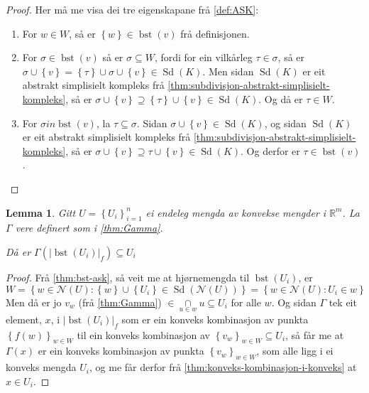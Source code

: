 \documentclass[a4paper, 12pt, norsk]{article}
\theoremstyle{plain}
\newtheorem{lemma}[theorem]{Lemma}
\theoremstyle{definition}
\newcommand{\Rb}{\mathbb{R}}
\newcommand{\Nc}{\mathcal{N}}
\newcommand{\intersect}{ \mathop{\cap}\limits } %
\newcommand{\union}{ \mathop{\cup}\limits }
\newcommand{\gr}[1]{ \lvert #1 \rvert } %
\newcommand{\set}[1]{ \left \{ #1 \right \} } %
\DeclareMathOperator{\Sd}{Sd}
\DeclareMathOperator{\bst}{bst}
\begin{document}
\begin{proof}
	Her må me visa dei tre eigenskapane frå \autoref{def:ASK}:
	\begin{enumerate}
		\item{For \( w \in W \), så er \( \set{w} \in \bst(v) \) frå definisjonen.}
  		\item{For \( \sigma \in \bst(v) \) så er \( \sigma \subseteq W \), fordi for ein vilkårleg \( \tau \in \sigma \), så er \( \sigma \union \set{v} = \set{\tau} \union \sigma \union \set{v} \in \Sd(K) \). Men sidan \( \Sd(K) \) er eit abstrakt simplisielt kompleks frå \autoref{thm:subdivisjon-abstrakt-simplisielt-kompleks}, så er \( \sigma \union \set{v} \supseteq \set{\tau} \union \set{v} \in \Sd(K) \). Og då er \( \tau \in W \).}
    	\item{For \( \sigma in \bst(v) \), la \( \tau \subseteq \sigma \). Sidan \( \sigma \union \set{v} \in \Sd(K) \), og sidan \( \Sd(K) \) er eit abstrakt simplisielt kompleks frå \autoref{thm:subdivisjon-abstrakt-simplisielt-kompleks}, så er \( \sigma \union \set{v} \supseteq \tau \union \set{v} \in \Sd(K) \). Og derfor er \( \tau \in \bst(v) \).}
	\end{enumerate}
\end{proof}

\begin{lemma} \label{thm:Gamma-inni-ui}
	Gitt \( U = \set{U_i}_{i=1}^n \) ei endeleg mengda av konvekse mengder i \( \Rb^m \). La \( \Gamma \) vere definert som i \autoref{thm:Gamma}.

	Då er \( \Gamma(\gr{\bst(U_i)}_f) \subseteq U_i \)
\end{lemma}

\begin{proof}
	Frå \autoref{thm:bst-ask}, så veit me at hjørnemengda til \( \bst(U_i) \), er
	\[
		W = \set{w \in \Nc(U) : \set{w} \union \set{U_i} \in \Sd(\Nc(U))}=\set{w \in \Nc(U) : U_i \in w}
	\] 
	Men då er jo \( v_w \) (frå \autoref{thm:Gamma}) \( \in \intersect_{u \in w} u \subseteq U_i \) for alle \( w \). Og sidan \( \Gamma \) tek eit element, \( x \), i \( \gr{\bst(U_i)}_f \) som er ein konveks kombinasjon av punkta \( \set{f(w)}_{w \in W} \) til ein konveks kombinasjon av \( \set{v_w}_{w \in W} \subseteq U_i \), så får me at \( \Gamma(x) \) er ein konveks kombinasjon av punkta \( \set{v_w}_{w \in W} \), som alle ligg i ei konveks mengda \( U_i \), og me får derfor frå \autoref{thm:konveks-kombinasjon-i-konveks} at \( x \in U_i \).
\end{proof}
\end{document}
